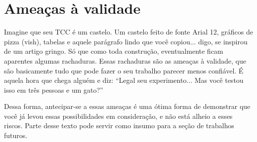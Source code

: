 \chapter{Ameaças à validade}
\label{chap:ameacas_validade}

Imagine que seu TCC é um castelo. Um castelo feito de fonte Arial 12, gráficos de pizza (vish), tabelas e aquele parágrafo lindo que você copiou... digo, se inspirou de um artigo gringo. Só que como toda construção, eventualmente ficam aparentes algumas rachaduras. Essas rachaduras são as ameaças à validade, que são basicamente tudo que pode fazer o seu trabalho parecer menos confiável. É aquela hora que chega alguém e diz: “Legal seu experimento... Mas você testou isso em três pessoas e um gato?”

Dessa forma, antecipar-se a essas ameaças é uma ótima forma de demonstrar que você já levou essas possibilidades em consideração, e não está alheio a esses riscos. Parte desse texto pode servir como insumo para a seção de trabalhos futuros.